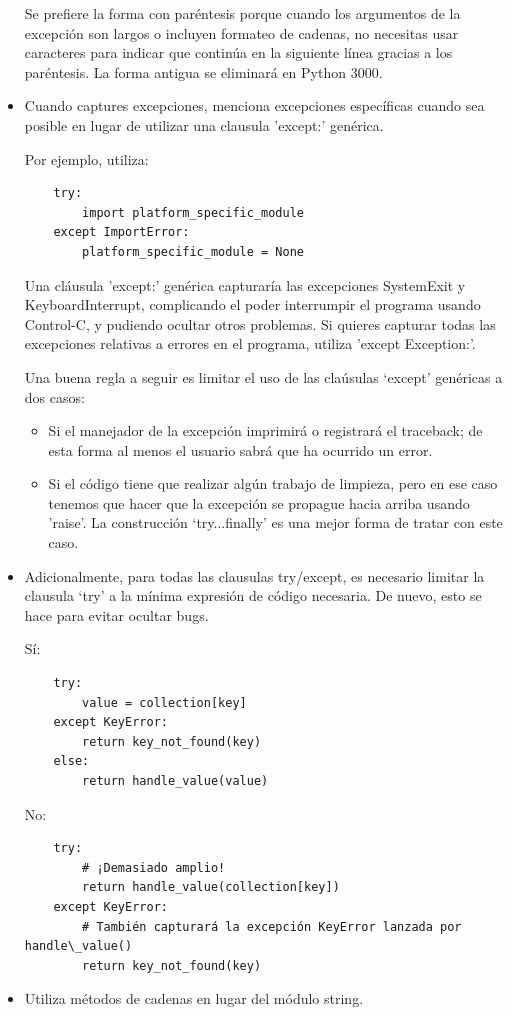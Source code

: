 \documentclass[a4paper,11pt,oneside]{book}
\begin{document}
\begin{itemize}
Se prefiere la forma con paréntesis porque cuando los argumentos de la excepción son largos o incluyen formateo de cadenas, no necesitas usar caracteres para indicar que continúa en la siguiente línea gracias a los paréntesis. La forma antigua se eliminará en Python 3000.
\item Cuando captures excepciones, menciona excepciones específicas cuando sea posible en lugar de utilizar una clausula 'except:' genérica.

Por ejemplo, utiliza:
\begin{lstlisting}
    try:
        import platform_specific_module
    except ImportError:
        platform_specific_module = None
\end{lstlisting}
Una cláusula 'except:' genérica capturaría las excepciones SystemExit y KeyboardInterrupt, complicando el poder interrumpir el programa usando Control-C, y pudiendo ocultar otros problemas. Si quieres capturar todas las excepciones relativas a errores en el programa, utiliza 'except Exception:'.

Una buena regla a seguir es limitar el uso de las claúsulas `except' genéricas a dos casos:
\begin{itemize}
\item Si el manejador de la excepción imprimirá o registrará el traceback; de esta forma al menos el usuario sabrá que ha ocurrido un error.
\item Si el código tiene que realizar algún trabajo de limpieza, pero en ese caso tenemos que hacer que la excepción se propague hacia arriba usando 'raise'. La construcción `try...finally'  es una mejor forma de tratar con este caso.
\end{itemize}
\item Adicionalmente, para todas las clausulas try/except, es necesario limitar la clausula `try' a la mínima expresión de código necesaria. De nuevo, esto se hace para evitar ocultar bugs.

Sí:
\begin{lstlisting}
    try:
        value = collection[key]
    except KeyError:
        return key_not_found(key)
    else:
        return handle_value(value)
\end{lstlisting}
No:
\begin{lstlisting}
    try:
        # ¡Demasiado amplio!
        return handle_value(collection[key])
    except KeyError:
        # También capturará la excepción KeyError lanzada por handle\_value()
        return key_not_found(key)
\end{lstlisting}
\item Utiliza métodos de cadenas en lugar del módulo string.


\end{itemize}
\end{document}
